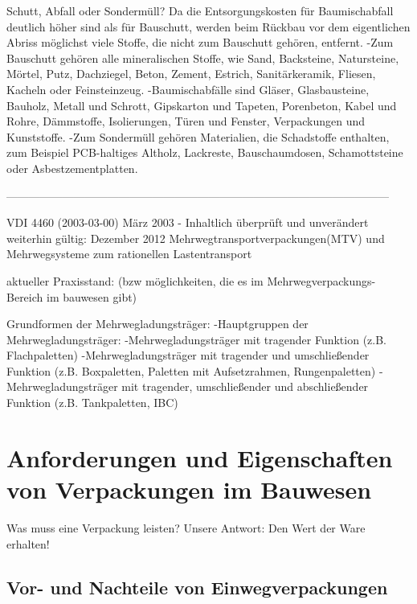Schutt, Abfall oder Sondermüll?
Da die Entsorgungskosten für Baumischabfall deutlich höher sind als für Bauschutt, werden beim Rückbau vor dem eigentlichen Abriss möglichst viele Stoffe, die nicht zum Bauschutt gehören, entfernt.
    -Zum Bauschutt gehören alle mineralischen Stoffe, wie Sand, Backsteine, Natursteine, Mörtel, Putz, Dachziegel, Beton, Zement, Estrich, Sanitärkeramik, Fliesen, Kacheln oder Feinsteinzeug. 
    -Baumischabfälle sind Gläser, Glasbausteine, Bauholz, Metall und Schrott, Gipskarton und Tapeten, Porenbeton, Kabel und Rohre, Dämmstoffe, Isolierungen, Türen und Fenster, Verpackungen und Kunststoffe. 
    -Zum Sondermüll gehören Materialien, die Schadstoffe enthalten, zum Beispiel PCB-haltiges Altholz, Lackreste, Bauschaumdosen, Schamottsteine oder Asbestzementplatten. 
    
------------------------------------------------------------------------------------------------------

VDI 4460 (2003-03-00) März 2003 - Inhaltlich überprüft und unverändert weiterhin gültig: Dezember 2012
Mehrwegtransportverpackungen(MTV) und Mehrwegsysteme zum rationellen Lastentransport

aktueller Praxisstand: (bzw möglichkeiten, die es im Mehrwegverpackungs-Bereich im bauwesen gibt)
    
    Grundformen der Mehrwegladungsträger:
        -Hauptgruppen der Mehrwegladungsträger:
            -Mehrwegladungsträger mit tragender Funktion (z.B. Flachpaletten)
            -Mehrwegladungsträger mit tragender und umschließender Funktion (z.B. Boxpaletten, Paletten mit Aufsetzrahmen, Rungenpaletten)
            -Mehrwegladungsträger mit tragender, umschließender und abschließender Funktion (z.B. Tankpaletten, IBC)


\section{Anforderungen und Eigenschaften von Verpackungen im Bauwesen}
\label{sec:Anforderungen und Eigenschaften von Verpackungen im Bauwesen}

Was muss eine Verpackung leisten? Unsere Antwort: Den Wert der Ware erhalten!


\subsection{Vor- und Nachteile von Einwegverpackungen}
\label{sec:Vor- und Nachteile von Einwegverpackungen}


